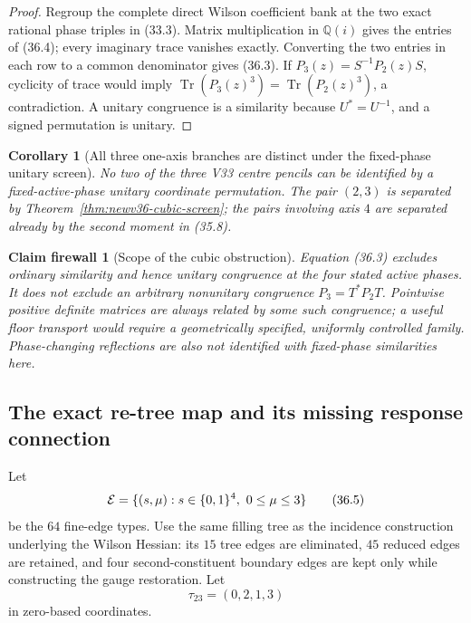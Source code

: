 \documentclass[11pt,oneside]{article}
\newtheorem{corollary}[theorem]{Corollary}
\newtheorem{firewall}[theorem]{Claim firewall}
\theoremstyle{definition}
\theoremstyle{remark}
\newcommand{\Tr}{\operatorname{Tr}}
\begin{document}
\begin{proof}
Regroup the complete direct Wilson coefficient bank at the two exact
rational phase triples in (33.3).  Matrix multiplication in
\(\mathbb Q(i)\) gives the entries of (36.4); every imaginary trace
vanishes exactly.  Converting the two entries in each row to a common
denominator gives (36.3).  If
\(P_3(z)=S^{-1}P_2(z)S\), cyclicity of trace would imply
\(\Tr(P_3(z)^3)=\Tr(P_2(z)^3)\), a contradiction.  A unitary
congruence is a similarity because \(U^*=U^{-1}\), and a signed
permutation is unitary.
\end{proof}

\begin{corollary}[All three one-axis branches are distinct under the
fixed-phase unitary screen]
\label{cor:newv36-three-orbits}
No two of the three V33 centre pencils can be identified by a
fixed-active-phase unitary coordinate permutation.  The pair
\((2,3)\) is separated by Theorem~\ref{thm:newv36-cubic-screen};
the pairs involving axis \(4\) are separated already by the second
moment in (35.8).
\end{corollary}

\begin{firewall}[Scope of the cubic obstruction]
\label{fire:newv36-cubic}
Equation (36.3) excludes ordinary similarity and hence unitary
congruence at the four stated active phases.  It does not exclude an
arbitrary nonunitary congruence \(P_3=T^*P_2T\).  Pointwise positive
definite matrices are always related by some such congruence; a
useful floor transport would require a geometrically specified,
uniformly controlled family.  Phase-changing reflections are also
not identified with fixed-phase similarities here.
\end{firewall}

\subsection{The exact re-tree map and its missing response connection}

Let
\[
 {\cal E}=\{(s,\mu):s\in\{0,1\}^4,\ 0\le\mu\le3\}
                                                               \tag{36.5}
\]
be the \(64\) fine-edge types.  Use the same filling tree as the
incidence construction underlying the Wilson Hessian: its
\(15\) tree edges are eliminated, \(45\) reduced edges are retained,
and four second-constituent boundary edges are kept only while
constructing the gauge restoration.  Let
\[
 \tau_{23}=(0,2,1,3)                                  \tag{36.6}
\]
in zero-based coordinates.
\end{document}
